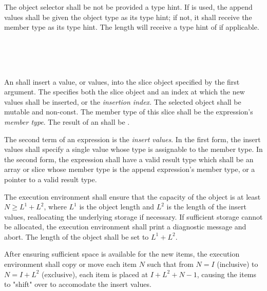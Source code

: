 \specsubsubitem
The object selector shall be not be provided a type hint. If  is
used, the append values shall be given the object type as its type hint; if
not, it shall receive the member type as its type hint. The length will receive
a type hint of  if applicable.


\begin{grammar}
 \\
	  \terminal{(}  \terminal{,}  \terminal{)} \\
	  \terminal{(}  \terminal{,}   \terminal{)} \\
\end{grammar}


\specsubsubitem
An  shall insert a value, or values, into the
slice object specified by the first argument. The
 specifies both the slice object and an index
at which the new values shall be inserted, or the \textit{insertion index}.
The selected object shall be mutable and non-const. The member type of this
slice shall be the expression's \textit{member type}. The result of an
 shall be .

\specsubsubitem
The second term of an  expression is the \textit{insert
values}. In the first form, the insert values shall specify a single value
whose type is assignable to the member type. In the second form, the expression
shall have a valid result type which shall be an array or slice whose member
type is the append expression's member type, or a pointer to a valid result
type.

\specsubsubitem
The execution environment shall ensure that the capacity of the object is at
least $N \geq L^1 + L^2$, where $L^1$ is the object length and $L^2$ is the
length of the insert values, reallocating the underlying storage if necessary.
If sufficient storage cannot be allocated, the execution environment shall
print a diagnostic message and abort. The length of the object shall be set to
$L^1 + L^2$.

\specsubsubitem
After ensuring sufficient space is available for the new items, the execution
environment shall copy or move each item $N$ such that from $N=I$ (inclusive)
to $N=I+L^2$ (exclusive), each item is placed at $I+L^2+N-1$, causing the items
to "shift" over to accomodate the insert values.

